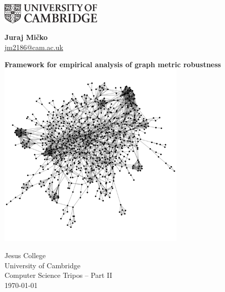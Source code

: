 \documentclass[12pt,a4paper,twoside,openany]{report}
\begin{document}


    \pagestyle{empty}

    \begin{minipage}{.45\linewidth}
        \begin{flushleft}
            \includegraphics[height=10mm]{uc-black-white.eps}
        \end{flushleft}
    \end{minipage}
    \hfill
    \begin{minipage}{.45\linewidth}
        \begin{flushright}
            \Large \textbf{Juraj Mi\v{c}ko} \\
            \normalsize \href{mailto:jm2186@cam.ac.uk}{jm2186@cam.ac.uk}
        \end{flushright}
    \end{minipage}

    \vspace*{45mm}
    \begin{center}
        \LARGE
        \textbf{Framework for empirical analysis of graph metric robustness} \\[5mm]

        \vspace{5mm}
        \includegraphics[height=9cm]{cover_graph_img.png}
        \vspace{5mm}

        \Large
        Jesus College \\
        University of Cambridge \\[5mm]
        Computer Science Tripos -- Part II \\[5mm]
        \today  %
    \end{center}
\end{document}
